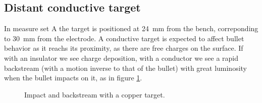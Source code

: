 \subsection{Distant conductive target}
In measure set A the target is positioned at \SI{24}{\milli\meter} from the bench, correponding to \SI{30}{\milli\meter} from the electrode. A conductive target is expected to affect bullet behavior as it reachs its proximity, as there are free charges on the surface. If with an insulator we see charge deposition, with a conductor we see a rapid backstream (with a motion inverse to that of the bullet) with great luminosity when the bullet impacts on it, as in figure \ref{fig:elio_met}.
\begin{figure}
 \centering
 \hfill
 \hfill
 \caption{Impact and backstream with a copper target.}
 \label{fig:elio_met}
\end{figure}

